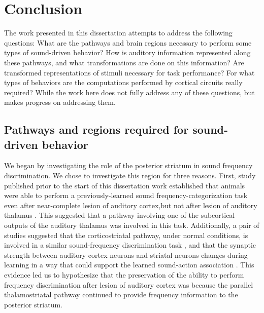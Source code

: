 \chapter{Conclusion}


The work presented in this dissertation attempts to address the following questions: 
%
What are the pathways and brain regions necessary to perform some types of sound-driven behavior? 
%
How is auditory information represented along these pathways, and what transformations are done on this information?
%
Are transformed representations of stimuli necessary for task performance?
%
For what types of behaviors are the computations performed by cortical circuits really required?
%
While the work here does not fully address any of these questions, but makes progress on addressing them.

\section{Pathways and regions required for sound-driven behavior}
We began by investigating the role of the posterior striatum in sound frequency discrimination. 
%
We chose to investigate this region for three reasons. 
%
First, study published prior to the start of this dissertation work established that animals were able to perform a previously-learned sound frequency-categorization task even after near-complete lesion of auditory cortex,but not after lesion of auditory thalamus \citep{Gimenez2015}.
%
This suggested that a pathway involving one of the subcortical outputs of the auditory thalamus was involved in this task.
%
Additionally, a pair of studies suggested that the corticostriatal pathway, under normal conditions, is involved in a similar sound-frequency discrimination task \citep{Znamenskiy201}, and that the synaptic strength between auditory cortex neurons and striatal neurons changes during learning in a way that could support the learned sound-action association \citep{Xiong2015}.
%
This evidence led us to hypothesize that the preservation of the ability to perform frequency discrimination after lesion of auditory cortex was because the parallel thalamostriatal pathway continued to provide frequency information to the posterior striatum.

